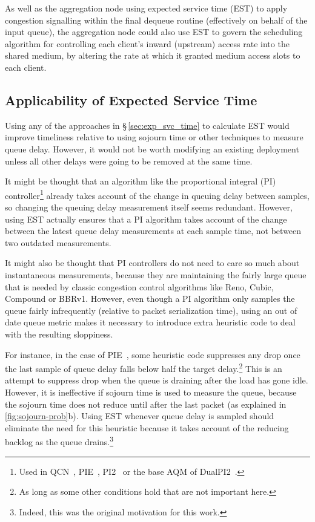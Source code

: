 As well as the aggregation node using expected service time (EST) to apply congestion signalling within the final dequeue routine (effectively on behalf of the input queue), the aggregation node could also use EST to govern the scheduling algorithm for controlling each client's inward (upstream) access rate into the shared medium, by altering the rate at which it granted medium access slots to each client.

\subsection{Applicability of Expected Service Time}\label{sec:inst_svc_time_applic}

Using any of the approaches in \S\,\ref{sec:exp_svc_time} to calculate EST would improve timeliness relative to using sojourn time or other techniques to measure queue delay. However, it would not be worth modifying an existing deployment unless all other delays were going to be removed at the same time. 

It might be thought that an algorithm like the proportional integral (PI) controller\footnote{Used in QCN~\cite{IEEE802.1Qau:Ethernet_QCN}, PIE~\cite{Pan17:PIE}, PI2~\cite{DeSchepper16a:PI2} or the base AQM of DualPI2~\cite{Briscoe15e:DualQ-Coupled-AQM_ID}.} already takes account of the change in queuing delay between samples, so changing the queuing delay measurement itself seems redundant. However, using EST actually ensures that a PI algorithm takes account of the change between the latest queue delay measurements at each sample time, not between two outdated measurements.

It might also be thought that PI controllers do not need to care so much about instantaneous measurements, because they are maintaining the fairly large queue that is needed by classic congestion control algorithms like Reno, Cubic, Compound or BBRv1. However, even though a PI algorithm only samples the queue fairly infrequently (relative to packet serialization time), using an out of date queue metric makes it necessary to introduce extra heuristic code to deal with the resulting sloppiness.

For instance, in the case of PIE~\cite{Pan17:PIE}, some heuristic code suppresses any drop once the last sample of queue delay falls below half the target delay.\footnote{As long as some other conditions hold that are not important here.} This is an attempt to suppress drop when the queue is draining after the load has gone idle. However, it is ineffective if sojourn time is used to measure the queue, because the sojourn time does not reduce until after the last packet (as explained in \autoref{fig:sojourn-prob}b). Using EST whenever queue delay is sampled should eliminate the need for this heuristic because it takes account of the reducing backlog as the queue drains.\footnote{Indeed, this was the original motivation for this work.}

